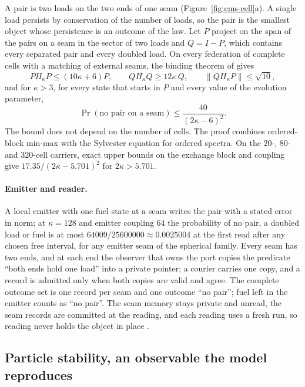 A pair is two loads on the two ends of one seam (Figure~\ref{fig:cms-cell}a). A single
load persists by conservation of the number of loads, so the pair is the smallest object
whose persistence is an outcome of the law. Let $P$ project on the span of the pairs on a
seam in the sector of two loads and $Q=I-P$, which contains every separated pair and
every doubled load. On every federation of complete cells with a matching of external
seams, the binding theorem of \cite{ophmodel} gives
\[
 PH_\kappa P\le(10\kappa+6)P,\qquad QH_\kappa Q\ge12\kappa\,Q,\qquad
 \|QH_\kappa P\|\le\sqrt{10},
\]
and for $\kappa>3$, for every state that starts in $P$ and every value of the evolution
parameter,
\begin{equation}
 \Pr(\text{no pair on a seam})\le\frac{40}{(2\kappa-6)^2}.
 \label{eq:cms-binding}
\end{equation}
The bound does not depend on the number of cells. The proof combines ordered-block
min-max with the Sylvester equation for ordered spectra. On the $20$-, $80$- and $320$-cell carriers, exact upper bounds on the
exchange block and coupling give $17.35/(2\kappa-5.701)^2$ for
$2\kappa>5.701$.

\paragraph{Emitter and reader.}
A local emitter with one fuel state at a seam writes the pair with a stated error in
norm; at $\kappa=128$ and emitter coupling $64$ the probability of no pair, a doubled load
or fuel is at most $64009/25600000\approx0.0025004$ at the first read after any chosen free interval, for any emitter seam of the spherical family. Every
seam has two ends, and at each end the observer that owns the port copies the predicate
``both ends hold one load'' into a private pointer; a courier carries one copy, and a
record is admitted only when both copies are valid and agree. The complete outcome set is one record per seam and one
outcome ``no pair''; fuel left in the emitter counts as ``no pair''. The seam memory stays
private and unread, the seam records are committed at the reading, and each reading uses
a fresh run, so reading never holds the object in place \cite{ophmodel}.

\subsection{Particle stability, an observable the model reproduces}
\label{sec:cms-stability}

